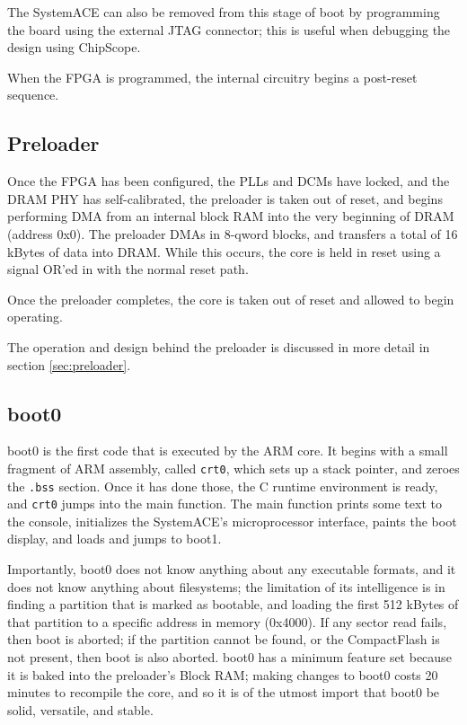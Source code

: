 \documentclass[10pt]{report}
\begin{document}
The SystemACE can also be removed from this stage of boot by programming the
board using the external JTAG connector; this is useful when debugging the
design using ChipScope.

When the FPGA is programmed, the internal circuitry begins a post-reset
sequence.

\subsection{Preloader}

Once the FPGA has been configured, the PLLs and DCMs have locked, and the
DRAM PHY has self-calibrated, the preloader is taken out of reset, and
begins performing DMA from an internal block RAM into the very beginning of
DRAM (address 0x0). The preloader DMAs in 8-qword blocks, and transfers a
total of 16 kBytes of data into DRAM. While this occurs, the core is held in
reset using a signal OR'ed in with the normal reset path.

Once the preloader completes, the core is taken out of reset and allowed to
begin operating.

The operation and design behind the preloader is discussed in more detail in
section \ref{sec:preloader}.

\subsection{boot0}

boot0 is the first code that is executed by the ARM core. It begins with a
small fragment of ARM assembly, called \texttt{crt0}, which sets up a stack
pointer, and zeroes the \texttt{.bss} section.  Once it has done those, the
C runtime environment is ready, and \texttt{crt0} jumps into the main
function.  The main function prints some text to the console, initializes
the SystemACE's microprocessor interface, paints the boot display, and loads
and jumps to boot1.

Importantly, boot0 does not know anything about any executable formats, and
it does not know anything about filesystems; the limitation of its
intelligence is in finding a partition that is marked as bootable, and
loading the first 512 kBytes of that partition to a specific address in
memory (0x4000). If any sector read fails, then boot is aborted; if the
partition cannot be found, or the CompactFlash is not present, then boot is
also aborted. boot0 has a minimum feature set because it is baked into the
preloader's Block RAM; making changes to boot0 costs 20 minutes to recompile
the core, and so it is of the utmost import that boot0 be solid, versatile,
and stable.
\end{document}
